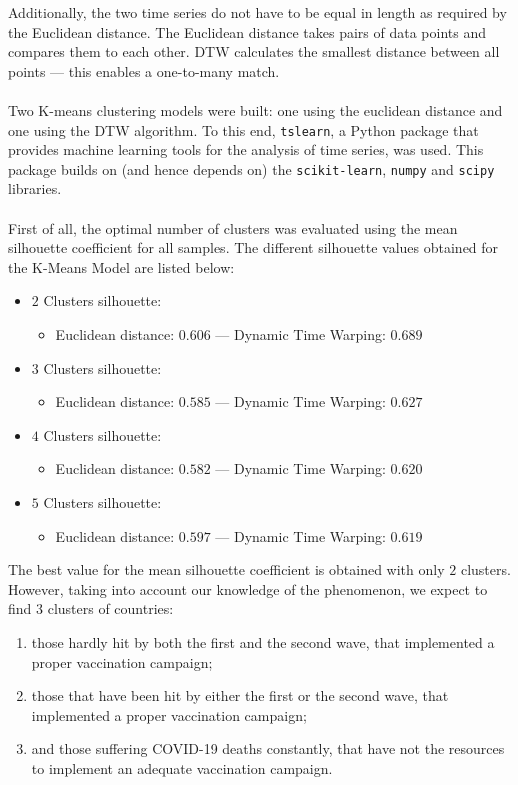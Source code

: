 \documentclass[11pt,a4paper]{article}
\begin{document}
\noindent
Additionally, the two time series do not have to be equal in length as required
by the Euclidean distance. The Euclidean distance takes pairs of data points and
compares them to each other. DTW calculates the smallest distance between all
points --- this enables a one-to-many match.\\
\\
Two K-means clustering models were built: one using the euclidean distance and
one using the DTW algorithm. To this end, \texttt{tslearn}, a Python package
that provides machine learning tools for the analysis of time series, was used.
This package builds on (and hence depends on) the \texttt{scikit-learn},
\texttt{numpy} and \texttt{scipy} libraries.\\
\\
First of all, the optimal number of clusters was evaluated using the mean
silhouette coefficient for all samples. The different silhouette values obtained
for the K-Means Model are listed below:
\begin{itemize}
    \item $2$ Clusters silhouette:
    \begin{itemize}
        \item Euclidean distance: $0.606$ --- Dynamic Time Warping: $0.689$
    \end{itemize}
    \item $3$ Clusters silhouette:
    \begin{itemize}
        \item Euclidean distance: $0.585$ --- Dynamic Time Warping: $0.627$
    \end{itemize}
    \item $4$ Clusters silhouette:
    \begin{itemize}
        \item Euclidean distance: $0.582$ --- Dynamic Time Warping: $0.620$
    \end{itemize}
    \item $5$ Clusters silhouette:
    \begin{itemize}
        \item Euclidean distance: $0.597$ --- Dynamic Time Warping: $0.619$
    \end{itemize}
\end{itemize}
The best value for the mean silhouette coefficient is obtained with only $2$
clusters. However, taking into account our knowledge of the phenomenon, we
expect to find $3$ clusters of countries:
\begin{enumerate}
    \item those hardly hit by both the first and the second wave, that
    implemented a proper vaccination campaign;
    \item those that have been hit by either the first or the second wave, that
    implemented a proper vaccination campaign;
    \item and those suffering COVID-19 deaths constantly, that have not the
    resources to implement an adequate vaccination campaign.
\end{enumerate}
\end{document}

